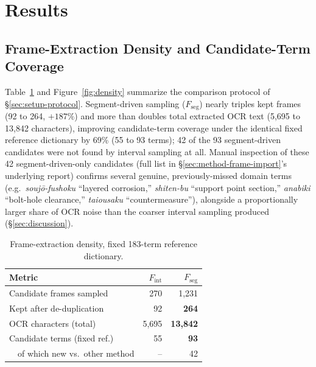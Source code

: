 ﻿\documentclass[twocolumn]{article}
\begin{document}
\section{Results}
\label{sec:results}

\subsection{Frame-Extraction Density and Candidate-Term Coverage}

Table~\ref{tab:framedensity} and Figure~\ref{fig:density} summarize the comparison protocol of
\S\ref{sec:setup-protocol}. Segment-driven sampling ($F_{\text{seg}}$) nearly triples kept frames
(92 to 264, $+187\%$) and more than doubles total extracted OCR text (5{,}695 to 13{,}842
characters), improving candidate-term coverage under the identical fixed reference dictionary by
69\% (55 to 93 terms); 42 of the 93 segment-driven candidates were not found by interval sampling at
all. Manual inspection of these 42 segment-driven-only candidates (full list in
\S\ref{sec:method-frame-import}'s underlying report) confirms several genuine, previously-missed
domain terms (e.g.\ \textit{souj\=o-fushoku} ``layered corrosion,'' \textit{shiten-bu} ``support
point section,'' \textit{anabiki} ``bolt-hole clearance,'' \textit{taiousaku} ``countermeasure''),
alongside a proportionally larger share of OCR noise than the coarser interval sampling produced
(\S\ref{sec:discussion}).

\begin{table}[t]
\centering
\caption{Frame-extraction density, fixed 183-term reference dictionary.}
\label{tab:framedensity}
\scriptsize
\begin{tabular}{lrr}
\toprule
Metric & $F_{\text{int}}$ & $F_{\text{seg}}$ \\
\midrule
Candidate frames sampled & 270 & 1{,}231 \\
Kept after de-duplication & 92 & \textbf{264} \\
OCR characters (total) & 5{,}695 & \textbf{13{,}842} \\
Candidate terms (fixed ref.) & 55 & \textbf{93} \\
\ \ of which new vs.\ other method & -- & 42 \\
\bottomrule
\end{tabular}
\end{table}
\end{document}
